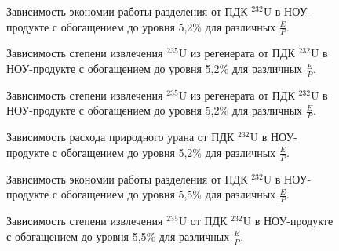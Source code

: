 \begin{figure}
    \centering
    \begin{minipage}{.5\textwidth}
      \centering
      
      \caption{{Зависимость экономии работы разделения от ПДК $^{232}$U в НОУ-продукте с обогащением до уровня 5,2\% для различных $\frac{E}{P}$.{\label{sw52}}}}
    \end{minipage}%
    \begin{minipage}{.5\textwidth}
      \centering
      
      \caption{{Зависимость степени извлечения $^{235}$U из регенерата от ПДК $^{232}$U в НОУ-продукте с обогащением до уровня 5,2\% для различных $\frac{E}{P}$.{\label{exR52}}}}
    \end{minipage}
\end{figure}


\begin{figure}
    \centering
    \begin{minipage}{.5\textwidth}
      \centering
      
\caption{{Зависимость степени извлечения $^{235}$U из регенерата от ПДК $^{232}$U в НОУ-продукте с обогащением до уровня 5,2\% для различных $\frac{E}{P}$.{\label{exR52}}}}
    \end{minipage}%
    \begin{minipage}{.5\textwidth}
      \centering
      
\caption{{Зависимость расхода природного урана от ПДК $^{232}$U в НОУ-продукте с обогащением до уровня 5,2\% для различных $\frac{E}{P}$.{\label{F0R52}}}}
    \end{minipage}
\end{figure}


\begin{figure}
    \centering
    \begin{minipage}{.5\textwidth}
      \centering
      
\caption{{Зависимость экономии работы разделения от ПДК $^{232}$U в НОУ-продукте с обогащением до уровня 5,5\% для различных $\frac{E}{P}$.{\label{sw55}}}}
    \end{minipage}%
    \begin{minipage}{.5\textwidth}
      \centering
      
\caption{{Зависимость степени извлечения $^{235}$U от ПДК $^{232}$U в НОУ-продукте с обогащением до уровня 5,5\% для различных $\frac{E}{P}$.{\label{ex55}}}}
\end{minipage}
\end{figure}

